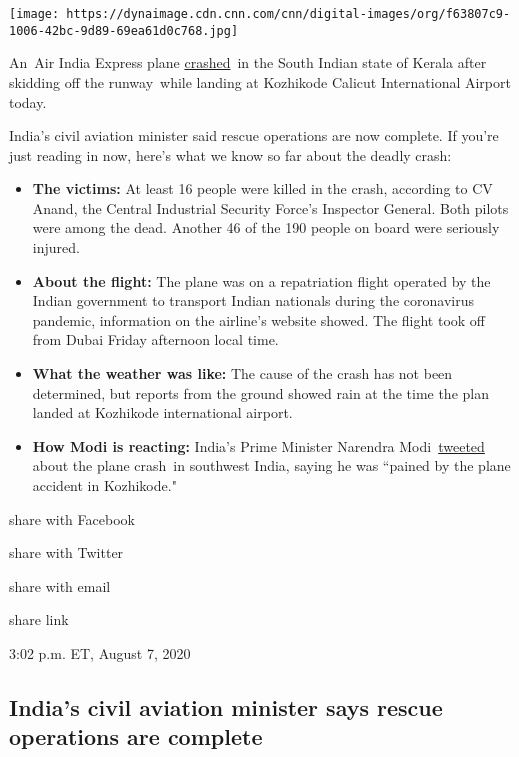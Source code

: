 \texttt{[image: https://dynaimage.cdn.cnn.com/cnn/digital-images/org/f63807c9-1006-42bc-9d89-69ea61d0c768.jpg]}

An~Air India Express plane
\href{https://www.cnn.com/2020/08/07/asia/plane-crash-calicut-india-intl/index.html}{crashed}~in
the South Indian state of Kerala after skidding off the runway~while
landing at Kozhikode Calicut International Airport today.

India's civil aviation minister said rescue operations are now complete.
If you're just reading in now, here's what we know so far about the
deadly crash:

\begin{itemize}
\tightlist
\item
  \textbf{The victims:} At least 16 people were killed in the crash,
  according to CV Anand, the Central Industrial Security Force's
  Inspector General. Both pilots were among the dead. Another 46 of the
  190 people on board were seriously injured.
\item
  \textbf{About the flight:} The plane was on a repatriation flight
  operated by the Indian government to transport Indian nationals during
  the coronavirus pandemic, information on the airline's website showed.
  The flight took off from Dubai Friday afternoon local time.
\item
  \textbf{What the weather was like:} The cause of the crash has not
  been determined, but reports from the ground showed rain at the time
  the plan landed at Kozhikode international airport.
\item
  \textbf{How Modi is reacting:} India's Prime Minister Narendra
  Modi~\href{https://twitter.com/narendramodi/status/1291775276599263233?s=20}{tweeted}
  about the plane crash~in southwest India, saying he was ``pained by
  the plane accident in Kozhikode."
\end{itemize}

share with Facebook

share with Twitter

share with email

share link

3:02 p.m. ET, August 7, 2020

\hypertarget{indias-civil-aviation-minister-says-rescue-operations-are-complete}{%
\subsection{India's civil aviation minister says rescue operations are
complete}\label{indias-civil-aviation-minister-says-rescue-operations-are-complete}}

